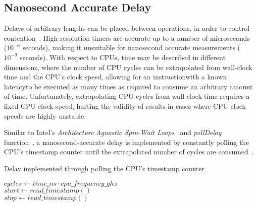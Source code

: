 \subsection{Nanosecond Accurate Delay}
Delays of arbitrary lengths can be placed between operations, in order to
control contention~\citep{valois1994queues}. High-resolution timers are
accurate up to a number of microseconds ($10^{-6}$ seconds), making it
unsuitable for nanosecond accurate measurements ($10^{-9}$ seconds). 
With respect to CPUs, time may be described in different dimensions, where the
number of CPU cycles can be extrapolated from wall-clock time and the CPU's
clock speed, allowing for an instruction\textemdash with a known
latency\textemdash to be executed as many times as required to consume an
arbitrary amount of time. Unfortunately, extrapolating CPU cycles from
wall-clock time requires a fixed CPU clock speed, hurting the validity of
results in cases where CPU clock speeds are highly unstable.


Similar to Intel's
\emph{Architecture Agnostic Spin-Wait Loops}~\citep{intel2018spinloop} and
\emph{pollDelay} function~\citep[Example~2.3]{intelmanualoptimization}, a
nanosecond-accurate delay is implemented by constantly polling the CPU's timestamp
counter until the extrapolated number of cycles are
consumed~\cite{ramalhete2019delay}.

\begin{algorithm}
    \caption{Delay implemented through polling the CPU's timestamp counter.}\label{alg:delay}
            $cycles \gets time\_ns \cdot cpu\_frequency\_ghz$ \\
            $start \gets read\_timestamp()$ \\
            {
                $stop \gets read\_timestamp()$
            }
\end{algorithm}

